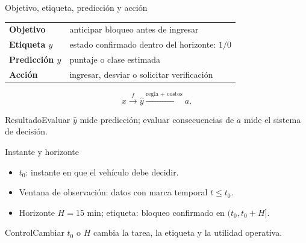 \documentclass[aspectratio=169,10pt]{beamer}
\begin{document}
\begin{frame}{Objetivo, etiqueta, predicción y acción}
  \small
  \begin{tabularx}{\textwidth}{>{\bfseries}p{}X}\toprule
  Objetivo & anticipar bloqueo antes de ingresar\\ Etiqueta $y$ & estado confirmado dentro del horizonte: $1/0$\\
  Predicción $\hat y$ & puntaje o clase estimada\\ Acción & ingresar, desviar o solicitar verificación\\\bottomrule
  \end{tabularx}
  \[x\xrightarrow{f}\hat y\xrightarrow{\text{regla + costos}}a.\]
  \begin{block}{Resultado}Evaluar $\hat y$ mide predicción; evaluar consecuencias de $a$ mide el sistema de decisión.\end{block}
\end{frame}

\begin{frame}{Instante y horizonte}
  \small
  \begin{itemize}
    \item $t_0$: instante en que el vehículo debe decidir.
    \item Ventana de observación: datos con marca temporal $t\le t_0$.
    \item Horizonte $H=15$ min; etiqueta: bloqueo confirmado en $(t_0,t_0+H]$.
  \end{itemize}
  \centering
  \begin{alertblock}{Control}Cambiar $t_0$ o $H$ cambia la tarea, la etiqueta y la utilidad operativa.\end{alertblock}
\end{frame}
\end{document}
